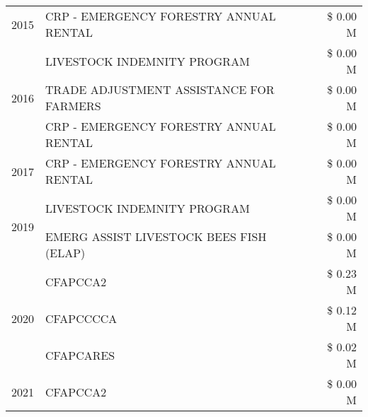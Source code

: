 \begin{tabular}{llr}
\cline{1-3}
2015 & CRP - EMERGENCY FORESTRY ANNUAL RENTAL & \$ 0.00 M \\
\cline{1-3}
\multirow[t]{3}{*}{2016} & LIVESTOCK INDEMNITY PROGRAM & \$ 0.00 M \\
 & TRADE ADJUSTMENT ASSISTANCE FOR FARMERS & \$ 0.00 M \\
 & CRP - EMERGENCY FORESTRY ANNUAL RENTAL & \$ 0.00 M \\
\cline{1-3}
2017 & CRP - EMERGENCY FORESTRY ANNUAL RENTAL & \$ 0.00 M \\
\cline{1-3}
\multirow[t]{2}{*}{2019} & LIVESTOCK INDEMNITY PROGRAM & \$ 0.00 M \\
 & EMERG ASSIST LIVESTOCK BEES FISH (ELAP) & \$ 0.00 M \\
\cline{1-3}
\multirow[t]{3}{*}{2020} & CFAPCCA2 & \$ 0.23 M \\
 & CFAPCCCCA & \$ 0.12 M \\
 & CFAPCARES & \$ 0.02 M \\
\cline{1-3}
2021 & CFAPCCA2 & \$ 0.00 M \\
\cline{1-3}
\bottomrule
\end{tabular}
